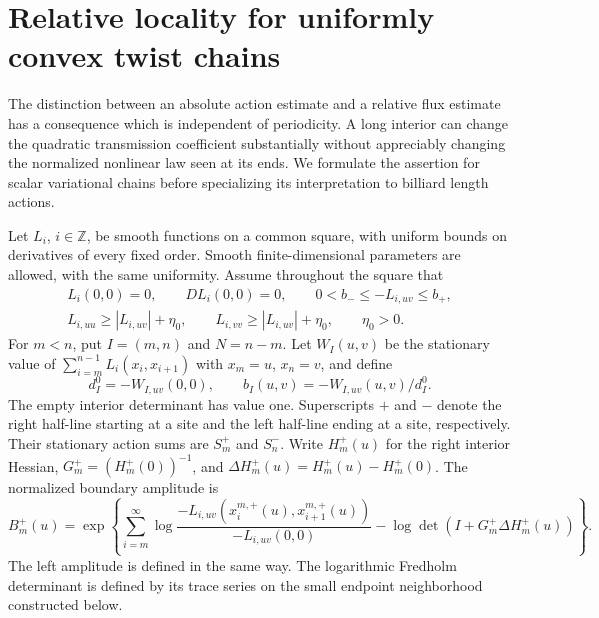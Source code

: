 
\section{Relative locality for uniformly convex twist chains}
\label{sec:v6-locality}
The distinction between an absolute action estimate and a relative flux
estimate has a consequence which is independent of periodicity. A long
interior can change the quadratic transmission coefficient substantially
without appreciably changing the normalized nonlinear law seen at its
ends. We formulate the assertion for scalar variational chains before
specializing its interpretation to billiard length actions.

Let $L_i$, $i\in\mathbb Z$, be smooth functions on a common square,
with uniform bounds on derivatives of every fixed order. Smooth
finite-dimensional parameters are allowed, with the same uniformity.
Assume throughout the square that
\begin{equation}\label{eq:v6-chain-class}
 \begin{gathered}
 L_i(0,0)=0,\qquad DL_i(0,0)=0,\qquad
 0<b_-\le-L_{i,uv}\le b_+,\\
 L_{i,uu}\ge |L_{i,uv}|+\eta_0,\qquad
 L_{i,vv}\ge |L_{i,uv}|+\eta_0,
 \qquad \eta_0>0.
 \end{gathered}
\end{equation}
For $m<n$, put $I=(m,n)$ and $N=n-m$. Let $W_I(u,v)$ be the
stationary value of $\sum_{i=m}^{n-1}L_i(x_i,x_{i+1})$ with
$x_m=u$, $x_n=v$, and define
\[
 d_I^0=-W_{I,uv}(0,0),\qquad b_I(u,v)=-W_{I,uv}(u,v)/d_I^0.
\]
The empty interior determinant has value one. Superscripts $+$ and
$-$ denote the right half-line starting at a site and the left half-line
ending at a site, respectively. Their stationary action sums are
$S_m^+$ and $S_n^-$. Write $H_m^+(u)$ for the right interior Hessian,
$G_m^+=(H_m^+(0))^{-1}$, and $\Delta H_m^+(u)=H_m^+(u)-H_m^+(0)$.
The normalized boundary amplitude is
\begin{equation}\label{eq:v6-half-amplitude}
 B_m^+(u)=\exp\left\{
 \sum_{i=m}^\infty\log
 \frac{-L_{i,uv}(x_i^{m,+}(u),x_{i+1}^{m,+}(u))}{-L_{i,uv}(0,0)}
 -\log\det(I+G_m^+\Delta H_m^+(u))\right\}.
\end{equation}
The left amplitude is defined in the same way. The logarithmic
Fredholm determinant is defined by its trace series on the small
endpoint neighborhood constructed below.

